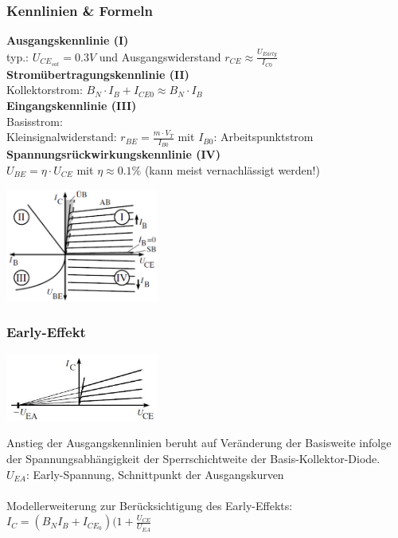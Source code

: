 	\subsubsection{Kennlinien \& Formeln}
		\begin{minipage}[c]{12cm}
			{\bf Ausgangskennlinie (I)}\\
				typ.: $U_{CE_{sat}}=0.3V$ und Ausgangswiderstand $r_{CE} \approx \frac{U_{Early}}{I_{C0}}$\\
				\hspace{2mm}
			{\bf Stromübertragungskennlinie (II)}\\
				Kollektorstrom: $B_N \cdot I_B + I_{CE0} \approx B_N \cdot I_B$\\
				\hspace{2mm}	
			{\bf Eingangskennlinie (III)}\\
				Basisstrom: \\
				Kleinsignalwiderstand: $r_{BE} = \frac{m\cdot V_T}{I_{B0}}$ mit $I_{B0}$: Arbeitspunktstrom\\
				\hspace{2mm}
			{\bf Spannungsrückwirkungskennlinie (IV)}\\
				$U_{BE} = \eta \cdot U_{CE}$ mit $\eta \approx 0.1 \%$ (kann meist vernachlässigt werden!)\\
        \end{minipage}	
		\begin{minipage}[c]{5cm}
			\includegraphics[width=5cm]{./images/BipTraKennlinien.png}
		\end{minipage}
	
	\subsubsection{Early-Effekt}
		\begin{minipage}[c]{5cm}
			\includegraphics[width=5cm]{images/early-effekt}
		\end{minipage}
		\begin{minipage}[c]{12cm}
			Anstieg der Ausgangskennlinien beruht auf Veränderung der Basisweite infolge
			der Spannungsabhängigkeit der Sperrschichtweite der Basis-Kollektor-Diode. \\
			$U_{EA}$: Early-Spannung, Schnittpunkt der Ausgangskurven \\
			\\
			Modellerweiterung zur Berücksichtigung des Early-Effekts: \\
			$I_C = (B_NI_B+I_{CE_0})(1+\frac{U_{CE}}{U_{EA}}$
		\end{minipage}
		
